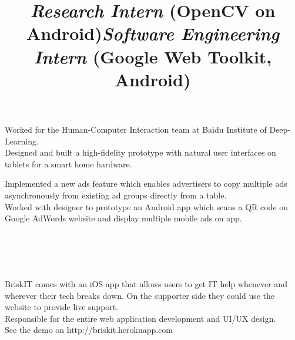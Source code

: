 \begin{resume}
\title{\textsl{Research Intern} (OpenCV on Android)}
\begin{position}
Worked for the Human-Computer Interaction team at Baidu Institute of Deep-Learning. \\
Designed and built a high-fidelity prototype with natural user interfaces on tablets for a smart home hardware.
\end{position}

\title{\textsl{Software Engineering Intern} (Google Web Toolkit, Android)}
\begin{position}
Implemented a new ads feature which enables advertisers to copy multiple ads asynchronously from existing ad groups directly from a table.\\
Worked with designer to prototype an Android app which scans a QR code on Google AdWords website and display multiple mobile ads on app.

\end{position}




\begin{formatb}
  \\
  \body\\
\end{formatb}

\section{}

\begin{position}
BriskIT comes with an iOS app that allows users to get IT help whenever and wherever their tech breaks down. On the supporter side they could use the website to provide live support. \\
Responsible for the entire web application development and UI/UX design. \\
See the demo on http://briskit.herokuapp.com
\end{position}


\end{resume}
